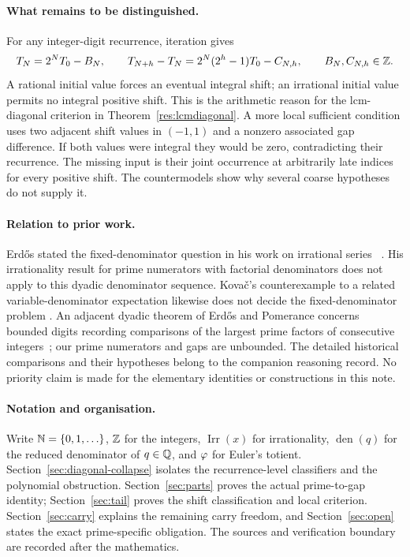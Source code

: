 \documentclass[11pt]{article}
\begin{document}
\paragraph{What remains to be distinguished.}
For any integer-digit recurrence, iteration gives
\[
 T_N=2^NT_0-B_N,\qquad
 T_{N+h}-T_N=2^N(2^h-1)T_0-C_{N,h},
 \qquad B_N,C_{N,h}\in\mathbb{Z}.
\]
A rational initial value forces an eventual integral shift; an irrational
initial value permits no integral positive shift.  This is the arithmetic
reason for the lcm-diagonal criterion in Theorem~\ref{res:lcmdiagonal}.
A more local sufficient condition uses two adjacent shift values in
$(-1,1)$ and a nonzero associated gap difference.  If both values were
integral they would be zero, contradicting their recurrence.  The missing
input is their joint occurrence at arbitrarily late indices for every
positive shift.  The countermodels show why several coarse hypotheses do
not supply it.

\paragraph{Relation to prior work.}
Erd\H{o}s stated the fixed-denominator question in his work on irrational
series~\cite[p.~94]{erdos1958}\cite[p.~62]{erdosgraham1980}%
\cite[p.~103]{erdos1988}.  His irrationality result for prime numerators
with factorial denominators does not apply to this dyadic denominator
sequence.  Kova\v{c}'s counterexample to a related variable-denominator
expectation likewise does not decide the fixed-denominator problem
\cite{kovac2026}.  An adjacent dyadic theorem of Erd\H{o}s and Pomerance
concerns bounded digits recording comparisons of the largest prime factors
of consecutive integers~\cite[\S7]{erdospomerance1978}; our prime numerators
and gaps are unbounded.  The detailed historical comparisons and their
hypotheses belong to the companion reasoning record.  No priority claim
is made for the elementary identities or constructions in this note.

\paragraph{Notation and organisation.}
Write $\mathbb{N}=\{0,1,\ldots\}$, $\mathbb{Z}$ for the integers,
$\operatorname{Irr}(x)$ for irrationality, $\operatorname{den}(q)$ for the
reduced denominator of $q\in\mathbb{Q}$, and $\varphi$ for Euler's totient.
Section~\ref{sec:diagonal-collapse} isolates the recurrence-level
classifiers and the polynomial obstruction.
Section~\ref{sec:parts} proves the actual prime-to-gap identity;
Section~\ref{sec:tail} proves the shift classification and local criterion.
Section~\ref{sec:carry} explains the remaining carry freedom, and
Section~\ref{sec:open} states the exact prime-specific obligation.
The sources and verification boundary are recorded after the mathematics.
\end{document}
